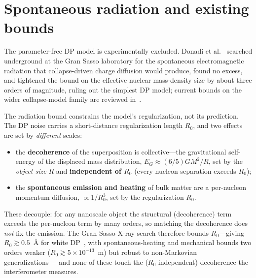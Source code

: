 \documentclass[aps,prd,onecolumn,amsmath,amssymb,nofootinbib,superscriptaddress]{revtex4-2}
\begin{document}
\section{Spontaneous radiation and existing bounds}\label{sec:radiation}

The parameter-free DP model is experimentally excluded. Donadi et al.~\cite{R8} searched underground
at the Gran Sasso laboratory for the spontaneous electromagnetic radiation that collapse-driven
charge diffusion would produce, found no excess, and tightened the bound on the effective nuclear
mass-density size by about three orders of magnitude, ruling out the simplest DP model; current
bounds on the wider collapse-model family are reviewed in~\cite{R25}.

The radiation bound constrains the model's regularization, not its prediction. The DP noise carries a
short-distance regularization length $R_0$, and two effects are set by \emph{different} scales:
\begin{itemize}
\item the \textbf{decoherence} of the superposition is collective---the gravitational self-energy of
the displaced mass distribution, $E_G\approx(6/5)GM^2/R$, set by the \emph{object size} $R$ and
\textbf{independent of $R_0$} (every nucleon separation exceeds $R_0$);
\item the \textbf{spontaneous emission and heating} of bulk matter are a per-nucleon momentum
diffusion, $\propto 1/R_0^3$, set by the regularization $R_0$.
\end{itemize}
These decouple: for any nanoscale object the structural (decoherence) term exceeds the per-nucleon term
by many orders, so matching the decoherence does \emph{not} fix the emission. The Gran Sasso X-ray
search therefore bounds $R_0$---giving $R_0\gtrsim0.5$~\AA{} for white DP~\cite{R8}, with
spontaneous-heating and mechanical bounds two orders weaker ($R_0\gtrsim5\times10^{-13}$~m) but robust
to non-Markovian generalizations~\cite{R25}---and none of these touch the ($R_0$-independent)
decoherence the interferometer measures.
\end{document}
